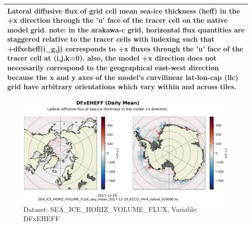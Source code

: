 \begin{longtable}{|m{}|m{}|m{}|m{}|}
\multicolumn{4}{|p{1\textwidth}|}{Lateral diffusive flux of grid cell mean sea-ice thickness (heff) in the +x direction through the 'u' face of the tracer cell on the native model grid. note: in the arakawa-c grid, horizontal flux quantities are staggered relative to the tracer cells with indexing such that +dfxeheff(i\_g,j) corresponds to +x fluxes through the 'u' face of the tracer cell at (i,j,k=0). also, the model +x direction does not necessarily correspond to the geographical east-west direction because the x and y axes of the model's curvilinear lat-lon-cap (llc) grid have arbitrary orientations which vary within and across tiles.} \\ \hline
\end{longtable}

\begin{figure}[H]
\centering
\includegraphics[scale=0.55]{../images/plots/native_plots/Sea-Ice_and_Snow_Horizontal_Volume_Fluxes/DFxEHEFF.png}
\caption{Dataset: SEA\_ICE\_HORIZ\_VOLUME\_FLUX, Variable: DFxEHEFF}
\label{tab:table-SEA_ICE_HORIZ_VOLUME_FLUX_DFxEHEFF-Plot}
\end{figure}
\pagebreak
